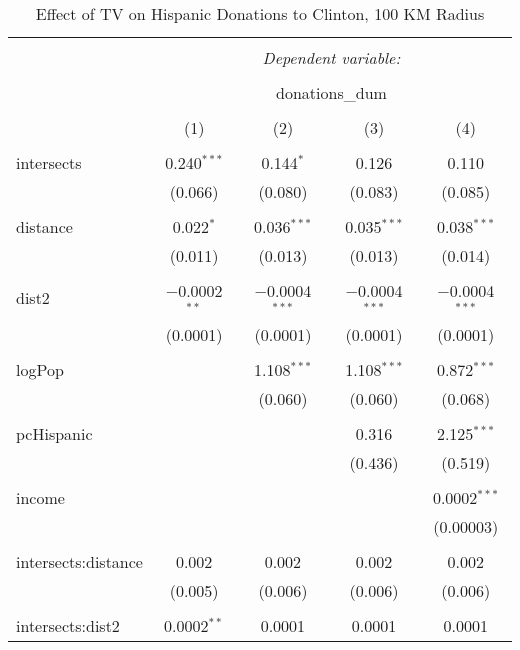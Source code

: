 
\begin{table}[!htbp] \centering 
  \caption{Effect of TV on Hispanic Donations to Clinton, 100 KM Radius} 
  \label{} 
\begin{tabular}{@{\extracolsep{-5pt}}lcccc} 
\\[-1.8ex]\hline 
\hline \\[-1.8ex] 
 & \multicolumn{4}{c}{\textit{Dependent variable:}} \\ 
\cline{2-5} 
\\[-1.8ex] & \multicolumn{4}{c}{donations\_dum} \\ 
\\[-1.8ex] & (1) & (2) & (3) & (4)\\ 
\hline \\[-1.8ex] 
 intersects & 0.240$^{***}$ & 0.144$^{*}$ & 0.126 & 0.110 \\ 
  & (0.066) & (0.080) & (0.083) & (0.085) \\ 
  & & & & \\ 
 distance & 0.022$^{*}$ & 0.036$^{***}$ & 0.035$^{***}$ & 0.038$^{***}$ \\ 
  & (0.011) & (0.013) & (0.013) & (0.014) \\ 
  & & & & \\ 
 dist2 & $-$0.0002$^{**}$ & $-$0.0004$^{***}$ & $-$0.0004$^{***}$ & $-$0.0004$^{***}$ \\ 
  & (0.0001) & (0.0001) & (0.0001) & (0.0001) \\ 
  & & & & \\ 
 logPop &  & 1.108$^{***}$ & 1.108$^{***}$ & 0.872$^{***}$ \\ 
  &  & (0.060) & (0.060) & (0.068) \\ 
  & & & & \\ 
 pcHispanic &  &  & 0.316 & 2.125$^{***}$ \\ 
  &  &  & (0.436) & (0.519) \\ 
  & & & & \\ 
 income &  &  &  & 0.0002$^{***}$ \\ 
  &  &  &  & (0.00003) \\ 
  & & & & \\ 
 intersects:distance & 0.002 & 0.002 & 0.002 & 0.002 \\ 
  & (0.005) & (0.006) & (0.006) & (0.006) \\ 
  & & & & \\ 
 intersects:dist2 & 0.0002$^{**}$ & 0.0001 & 0.0001 & 0.0001 \\ 

\end{tabular}
\end{table}
